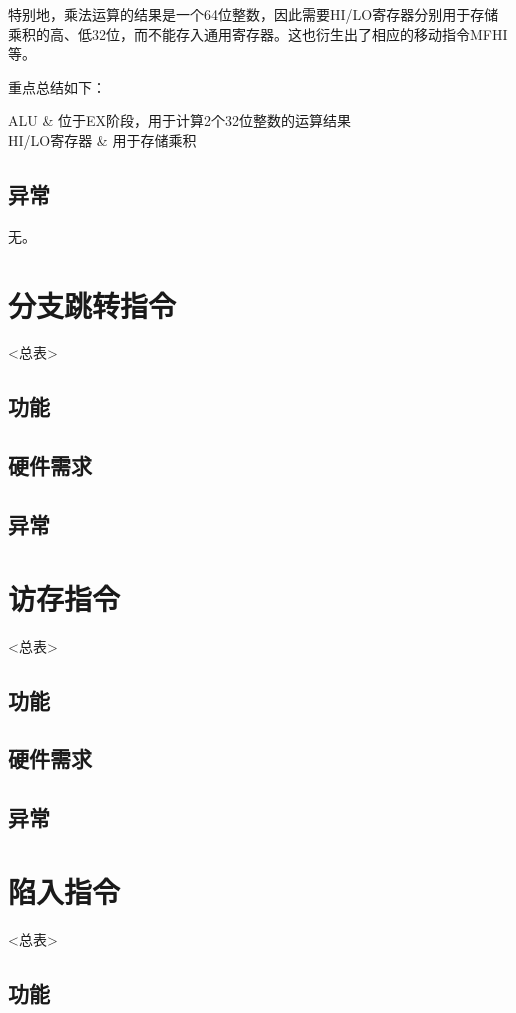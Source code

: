 特别地，乘法运算的结果是一个64位整数，因此需要HI/LO寄存器分别用于存储乘积的高、低32位，而不能存入通用寄存器。这也衍生出了相应的移动指令MFHI等。

重点总结如下：

    ALU & 位于EX阶段，用于计算2个32位整数的运算结果 \\
    HI/LO寄存器 & 用于存储乘积 \\
\tableend

\subsection{异常}

无。

\section{分支跳转指令}
<总表>
    \subsection{功能}
    \subsection{硬件需求}
    \subsection{异常}

\section{访存指令}
<总表>
    \subsection{功能}
    \subsection{硬件需求}
    \subsection{异常}

\section{陷入指令}
<总表>
    \subsection{功能}
